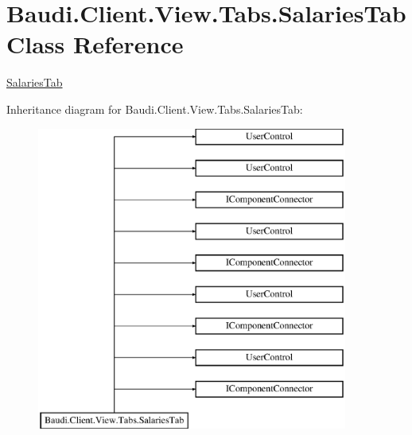 \hypertarget{class_baudi_1_1_client_1_1_view_1_1_tabs_1_1_salaries_tab}{}\section{Baudi.\+Client.\+View.\+Tabs.\+Salaries\+Tab Class Reference}
\label{class_baudi_1_1_client_1_1_view_1_1_tabs_1_1_salaries_tab}


\hyperlink{class_baudi_1_1_client_1_1_view_1_1_tabs_1_1_salaries_tab}{Salaries\+Tab}  


Inheritance diagram for Baudi.\+Client.\+View.\+Tabs.\+Salaries\+Tab\+:\begin{figure}[H]
\begin{center}
\leavevmode
\includegraphics[height=10.000000cm]{class_baudi_1_1_client_1_1_view_1_1_tabs_1_1_salaries_tab}
\end{center}
\end{figure}
